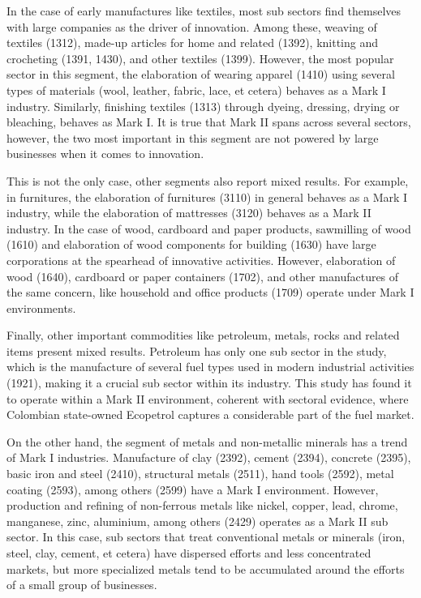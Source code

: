 \documentclass[12pt,a4paper]{article}
\begin{document}
In the case of early manufactures like textiles, most sub sectors find themselves with large companies as the driver of innovation. Among these, weaving of textiles (1312), made-up articles for home and related (1392), knitting and crocheting (1391, 1430), and other textiles (1399). However, the most popular sector in this segment, the elaboration of wearing apparel (1410) using several types of materials (wool, leather, fabric, lace, et cetera) behaves as a Mark I industry. Similarly, finishing textiles (1313) through dyeing, dressing, drying or bleaching, behaves as Mark I. It is true that Mark II spans across several sectors, however, the two most important in this segment are not powered by large businesses when it comes to innovation.  

This is not the only case, other segments also report mixed results. For example, in furnitures, the elaboration of furnitures (3110) in general behaves as a Mark I industry, while the elaboration of mattresses (3120) behaves as a Mark II industry. In the case of wood, cardboard and paper products, sawmilling of wood (1610) and elaboration of wood components for building (1630) have large corporations at the spearhead of innovative activities. However, elaboration of wood (1640), cardboard or paper containers (1702), and other manufactures of the same concern, like household and office products (1709) operate under Mark I environments. 

Finally, other important commodities like petroleum, metals, rocks and related items present mixed results. Petroleum has only one sub sector in the study, which is the manufacture of several fuel types used in modern industrial activities (1921), making it a crucial sub sector within its industry. This study has found it to operate within a Mark II environment, coherent with sectoral evidence, where Colombian state-owned Ecopetrol captures a considerable part of the fuel market. 

On the other hand, the segment of metals and non-metallic minerals has a trend of Mark I industries. Manufacture of clay (2392), cement (2394), concrete (2395), basic iron and steel (2410), structural metals (2511), hand tools (2592), metal coating (2593), among others (2599) have a Mark I environment. However, production and refining of non-ferrous metals like nickel, copper, lead, chrome, manganese, zinc, aluminium, among others (2429) operates as a Mark II sub sector. In this case, sub sectors that treat conventional metals or minerals (iron, steel, clay, cement, et cetera) have dispersed efforts and less concentrated markets, but more specialized metals tend to be accumulated around the efforts of a small group of businesses.
\end{document}
